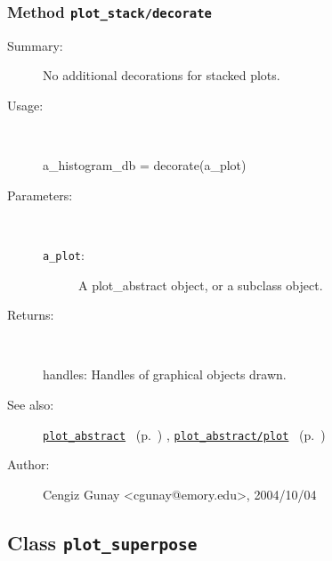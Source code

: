 \subsubsection[Method \texttt{decorate}]{Method \texttt{plot\_stack/decorate}}%
%
\label{ref_plot_stack__decorate}%
\hypertarget{ref_plot_stack__decorate}{}%
\begin{description}
\item[Summary:]No additional decorations for stacked plots.
%
\item[Usage:]~%
\begin{lyxcode}%
a\_histogram\_db = decorate(a\_plot)
%
\end{lyxcode}%
%
%
\item[Parameters:]~
\begin{description}%
\item[\texttt{a\_plot}:]
 A plot\_abstract object, or a subclass object.
\end{description}%
%
\item[Returns:]~

	handles: Handles of graphical objects drawn.
%
%
\item[See also:]%
\hyperlink{ref_plot_abstract}{\texttt{plot\_abstract}}%
\ (p.~\pageref{ref_plot_abstract})%
%
, \hyperlink{ref_plot_abstract__plot}{\texttt{plot\_abstract/plot}}%
\ (p.~\pageref{ref_plot_abstract__plot})%
%
%
\item[Author:]%
Cengiz Gunay <cgunay@emory.edu>, 2004/10/04%
\end{description}
\methodline%
\subsection{Class \texttt{plot\_superpose}}%
%
\label{ref_plot_superpose}%
\hypertarget{ref_plot_superpose}{}%
